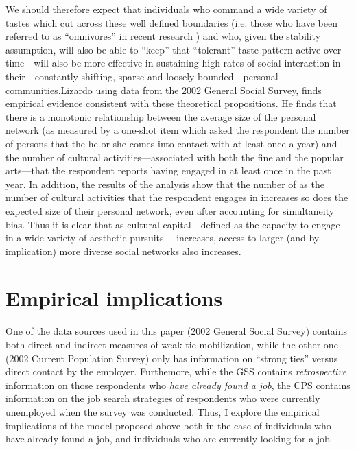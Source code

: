 \documentclass[12pt]{article}
\begin{document}
We should therefore expect that individuals who command a wide variety of tastes which cut across these well defined boundaries (i.e. those who have been referred to as ``omnivores'' in recent research \citep{peterson92, peterson05, peterson_rossman08}) and who, given the stability assumption, will also be able to ``keep'' that ``tolerant'' taste pattern active over time---will also be more effective in sustaining high rates of social interaction in their---constantly shifting, sparse and loosely bounded---personal communities.Lizardo \citeyearpar{lizardo06a} using data from the 2002 General Social Survey, finds empirical evidence consistent with these theoretical propositions. He finds that there is a monotonic relationship between the average size of the personal network (as measured by a one-shot item which asked the respondent the number of persons that the he or she comes into contact with at least once a year) and the number of cultural activities---associated with both the fine and the popular arts---that the respondent reports having engaged in at least once in the past year. In addition, the results of the analysis show that the number of as the number of cultural activities that the respondent engages in increases so does the expected size of their personal network, even after accounting for simultaneity bias. Thus it is clear that as cultural capital---defined as the capacity to engage in a wide variety of aesthetic pursuits \citep{bryson96, peterson_kern96, ollivier04}---increases, access to larger (and by implication) more diverse social networks also increases.

\section{Empirical implications}
One of the data sources used in this paper (2002 General Social Survey) contains both direct and indirect measures of weak tie mobilization, while the other one (2002 Current Population Survey) only has information on ``strong ties'' versus direct contact by the employer.  Furthemore, while the GSS contains \emph{retrospective} information on those respondents who \emph{have already found a job}, the CPS contains information on the job search strategies of respondents who were currently unemployed when the survey was conducted.  Thus, I explore the empirical implications of the model proposed above both in the case of individuals who have already found a job, and individuals who are currently looking for a job. 
\end{document}
